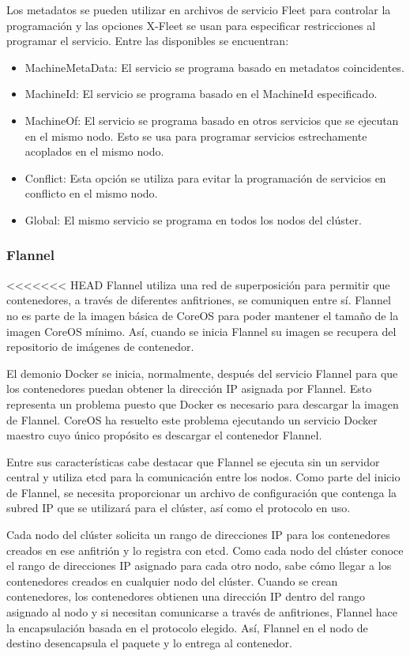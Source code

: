 Los metadatos se pueden utilizar en archivos de servicio Fleet para controlar la programación y las opciones X-Fleet se usan para especificar restricciones al programar el servicio. Entre las disponibles se encuentran:
\begin{itemize}
\item MachineMetaData: El servicio se programa basado en metadatos coincidentes.
\item MachineId: El servicio se programa basado en el MachineId especificado.
\item MachineOf: El servicio se programa basado en otros servicios que se ejecutan en el mismo nodo. Esto se usa para programar servicios estrechamente acoplados en el mismo nodo.
\item Conflict: Esta opción se utiliza para evitar la programación de servicios en conflicto en el mismo nodo.
\item Global: El mismo servicio se programa en todos los nodos del clúster.
\end{itemize}

\subsubsection{Flannel}

<<<<<<< HEAD
Flannel utiliza una red de superposición para permitir que contenedores, a través de diferentes anfitriones, se comuniquen entre sí. Flannel no es parte de la imagen básica de CoreOS para poder mantener el tamaño de la imagen CoreOS mínimo. Así, cuando se inicia Flannel su imagen se recupera del repositorio de imágenes de contenedor. 

El demonio Docker se inicia, normalmente, después del servicio Flannel para que los contenedores puedan obtener la dirección IP asignada por Flannel. Esto representa un problema puesto que Docker es necesario para descargar la imagen de Flannel. CoreOS ha resuelto este problema ejecutando un servicio Docker maestro cuyo único propósito es descargar el contenedor Flannel.

Entre sus características cabe destacar que Flannel se ejecuta sin un servidor central y utiliza etcd para la comunicación entre los nodos. Como parte del inicio de Flannel, se necesita proporcionar un archivo de configuración que contenga la subred IP que se utilizará para el clúster, así como el protocolo en uso.

Cada nodo del clúster solicita un rango de direcciones IP para los contenedores creados en ese anfitrión y lo registra con etcd. Como cada nodo del clúster conoce el rango de direcciones IP asignado para cada otro nodo, sabe cómo llegar a los contenedores creados en cualquier nodo del clúster. Cuando se crean contenedores, los contenedores obtienen una dirección IP dentro del rango asignado al nodo y si necesitan comunicarse a través de anfitriones, Flannel hace la encapsulación basada en el protocolo elegido. Así, Flannel en el nodo de destino desencapsula el paquete y lo entrega al contenedor.

